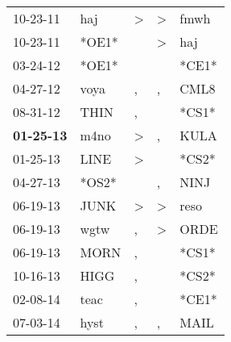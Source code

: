 \begin{supertabular}{p{0.07\textwidth}p{0.06\textwidth}p{0.02\textwidth}p{0.02\textwidth}p{0.06\textwidth}}
          10-23-11\textsuperscript{} &            haj\textsuperscript{} &     \textgreater &     \textgreater &           fmwh\textsuperscript{} \\
          10-23-11\textsuperscript{} &                            *OE1* &                  &     \textgreater &            haj\textsuperscript{} \\
          03-24-12\textsuperscript{} &                            *OE1* &                  &                  &                            *CE1* \\
          04-27-12\textsuperscript{} &           voya\textsuperscript{} &                , &                , &           CML8\textsuperscript{} \\
          08-31-12\textsuperscript{} &           THIN\textsuperscript{} &                , &                  &                            *CS1* \\
 \textbf{01-25-13\textsuperscript{}} &           m4no\textsuperscript{} &     \textgreater &                , &           KULA\textsuperscript{} \\
          01-25-13\textsuperscript{} &           LINE\textsuperscript{} &     \textgreater &                  &                            *CS2* \\
          04-27-13\textsuperscript{} &                            *OS2* &                  &                , &           NINJ\textsuperscript{} \\
          06-19-13\textsuperscript{} &           JUNK\textsuperscript{} &     \textgreater &     \textgreater &           reso\textsuperscript{} \\
          06-19-13\textsuperscript{} &           wgtw\textsuperscript{} &                , &     \textgreater &           ORDE\textsuperscript{} \\
          06-19-13\textsuperscript{} &           MORN\textsuperscript{} &                , &                  &                            *CS1* \\
          10-16-13\textsuperscript{} &           HIGG\textsuperscript{} &                , &                  &                            *CS2* \\
          02-08-14\textsuperscript{} &           teac\textsuperscript{} &                , &                  &                            *CE1* \\
          07-03-14\textsuperscript{} &           hyst\textsuperscript{} &                , &                , &           MAIL\textsuperscript{} \\

\end{supertabular}
